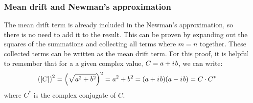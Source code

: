 \subsubsection{Mean drift and Newman's approximation}
The mean drift term is already included in the Newman's approximation, so there is no need to add it to the result.  This can be proven by expanding out the squares of the summations and collecting all terms where $m=n$ together.  These collected terms can be written as the mean drift term.  For this proof, it is helpful to remember that for a a given complex value, $C=a+{i\mkern1.5mu} b$, we can write:
\begin{equation}
   \left(\left| C \right| \right)^2 = \left( \sqrt{a^2 + b^2} \right)^2 = a^2 + b^2 = ( a +{i\mkern1.5mu} b ) ( a -{i\mkern1.5mu} b ) = C\cdot C^*
\label{eq:absComplexSquared}
\end{equation}
where $C^*$ is the complex conjugate of $C$.

